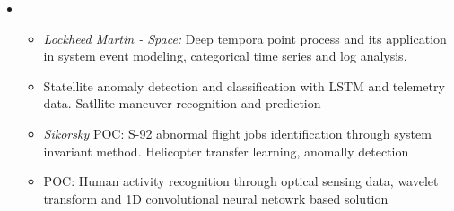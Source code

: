 \documentclass[11pt,a4paper,sans]{moderncv}        %
\begin{document}
\vspace{4pt}

\begin{itemize}

	\item{
		{\vspace{3pt}
			\begin{itemize}
				\item \emph{Lockheed Martin - Space:} Deep tempora point process and its application in system event modeling, categorical time series and log analysis.
				\item Statellite anomaly detection and classification with LSTM and telemetry data. Satllite maneuver recognition and prediction
				\item \emph{Sikorsky} POC: S-92 abnormal flight jobs identification through system invariant method. Helicopter transfer learning, anomally detection
				\item POC: Human activity recognition through optical sensing data, wavelet transform and 1D convolutional neural netowrk based solution
			\end{itemize}}}


\end{itemize}
\end{document}
